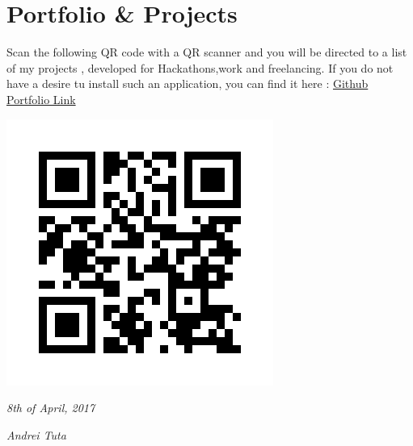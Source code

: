 \documentclass[]{friggeri-cv}
\begin{document}
\section{Portfolio \& Projects}
  \setlength{\parindent}{10ex}
    {Scan the following QR code with a QR scanner and you will be directed to a list of my projects , developed for Hackathons,work and freelancing.
    If you do not have a desire tu install such an application, you can find it here : \href{https://github.com/AndreiTuta/CV }{Github Portfolio Link} \n }\par
\includegraphics[scale=0.30]{img/static_qr_code_without_logo.jpg}
\n

\begin{flushleft}
\emph{8th of April, 2017}
\end{flushleft}
\begin{flushright}
\emph{Andrei Tuta}
\end{flushright}
\end{document}
